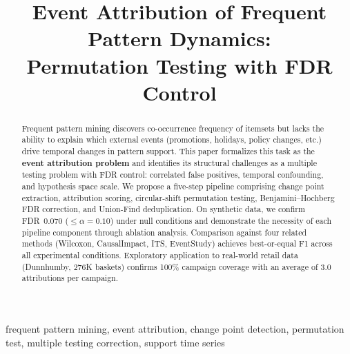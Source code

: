 \documentclass[conference]{IEEEtran}
\begin{document}
\title{Event Attribution of Frequent Pattern Dynamics:\\Permutation Testing with FDR Control}

\author{
  \and
}

\maketitle
\pagestyle{plain}

\begin{abstract}
Frequent pattern mining discovers co-occurrence frequency of itemsets but lacks
the ability to explain which external events (promotions, holidays, policy changes, etc.)
drive temporal changes in pattern support.
This paper formalizes this task as the \textbf{event attribution problem}
and identifies its structural challenges as a multiple testing problem with FDR control:
correlated false positives, temporal confounding, and hypothesis space scale.
We propose a five-step pipeline comprising change point extraction, attribution scoring,
circular-shift permutation testing, Benjamini--Hochberg FDR correction,
and Union-Find deduplication.
On synthetic data, we confirm FDR~0.070 ($\leq \alpha = 0.10$) under null conditions
and demonstrate the necessity of each pipeline component through ablation analysis.
Comparison against four related methods (Wilcoxon, CausalImpact, ITS, EventStudy)
achieves best-or-equal F1 across all experimental conditions.
Exploratory application to real-world retail data (Dunnhumby, 276K baskets)
confirms 100\% campaign coverage with an average of 3.0 attributions per campaign.
\end{abstract}

\begin{IEEEkeywords}
frequent pattern mining, event attribution, change point detection,
permutation test, multiple testing correction, support time series
\end{IEEEkeywords}
\end{document}
